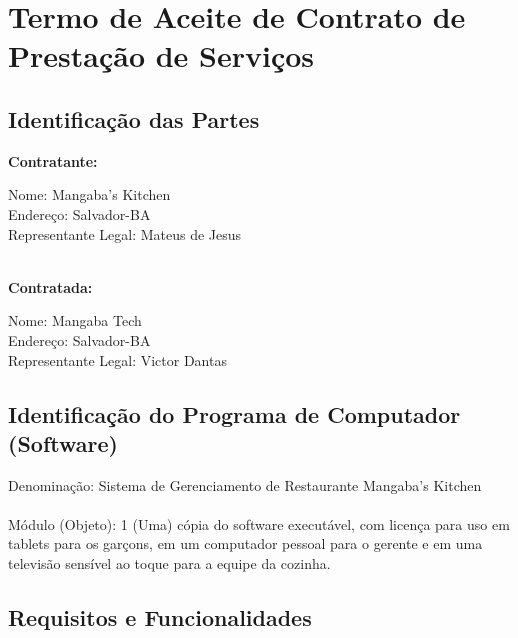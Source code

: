 
\begingroup
\hspace{4.5mm}
\setlength{\parindent}{0pt}


\section*{Termo de Aceite de Contrato de Prestação de Serviços}
\subsection*{Identificação das Partes}

\textbf{Contratante:}\\

\begingroup

    \leftskip 20pt
    \rightskip 20pt
    
    Nome: Mangaba’s Kitchen\\
    Endereço: Salvador-BA\\
    Representante Legal: Mateus de Jesus\\\\

\endgroup

\textbf{Contratada:}\\

\begingroup

    \leftskip 20pt
    \rightskip 20pt
    
    Nome: Mangaba Tech\\
    Endereço: Salvador-BA\\
    Representante Legal: Victor Dantas

\endgroup

\subsection*{Identificação do Programa de Computador (Software)}
Denominação: Sistema de Gerenciamento de Restaurante Mangaba's Kitchen\\\\
Módulo (Objeto): 1 (Uma) cópia do software executável, com licença para uso em tablets para os garçons, em um computador pessoal para o gerente e em uma televisão sensível ao toque para a equipe da cozinha.\\

\subsection*{Requisitos e Funcionalidades}

